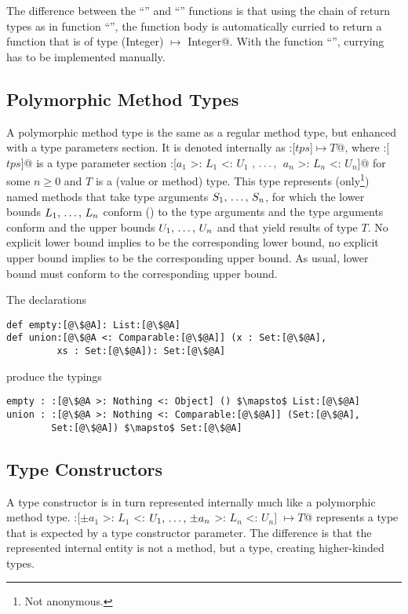 The difference between the ``'' and ``'' functions is that using the chain of return types as in function ``'', the function body is automatically curried to return a function that is of type \lstinline@(Integer) $\mapsto$ Integer@. With the function ``'', currying has to be implemented manually. 

\subsection{Polymorphic Method Types}
\label{sec:polymorphic-method-types}

A polymorphic method type is the same as a regular method type, but enhanced with a type parameters section. It is denoted internally as \lstinline@:[$tps$]$ \mapsto T$@, where \lstinline@:[$tps$]@ is a type parameter section \lstinline@:[$a_1$ >: $L_1$ <: $U_1$ $,\, \ldots ,\,$ $a_n$ >: $L_n$ <: $U_n$]@ for some $n \geq 0$ and $T$ is a (value or method) type. This type represents (only\footnote{Not anonymous.}) named methods that take type arguments $S_1 ,\, \ldots ,\, S_n$, for which the lower bounds $L_1 ,\, \ldots ,\, L_n$ conform () to the type arguments and the type arguments conform and the upper bounds $U_1 ,\, \ldots ,\, U_n$ and that yield results of type $T$. No explicit lower bound implies  to be the corresponding lower bound, no explicit upper bound implies  to be the corresponding upper bound. As usual, lower bound must conform to the corresponding upper bound. 

\example The declarations
\begin{lstlisting}[escapechar=@,deletekeywords={union}]
def empty:[@\$@A]: List:[@\$@A]
def union:[@\$@A <: Comparable:[@\$@A]] (x : Set:[@\$@A], 
         xs : Set:[@\$@A]): Set:[@\$@A]
\end{lstlisting}
produce the typings
\begin{lstlisting}[escapechar=@,deletekeywords={union}]
empty : :[@\$@A >: Nothing <: Object] () $\mapsto$ List:[@\$@A]
union : :[@\$@A >: Nothing <: Comparable:[@\$@A]] (Set:[@\$@A], 
        Set:[@\$@A]) $\mapsto$ Set:[@\$@A]
\end{lstlisting}

\subsection{Type Constructors}
\label{sec:type-constructors}

A type constructor is in turn represented internally much like a polymorphic method type. \lstinline@:[$\pm a_1$ >: $L_1$ <: $U_1 ,\, \ldots ,\, \pm a_n$ >: $L_n$ <: $U_n$] $\mapsto T$@ represents a type that is expected by a type constructor parameter. The difference is that the represented internal entity is not a method, but a type, creating higher-kinded types. 

